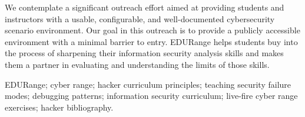 \documentclass[11pt]{report}
\begin{document}
We contemplate a significant outreach effort aimed at providing
students and instructors with a usable, configurable, and
well-documented cybersecurity scenario environment.  Our goal in this
outreach is to provide a publicly accessible environment with a
minimal barrier to entry.  EDURange helps students buy into the
process of sharpening their information security analysis skills and
makes them a partner in evaluating and understanding the limits of
those skills.

 EDURange; cyber range; hacker curriculum
principles; teaching security failure modes; debugging patterns;
information security curriculum; live-fire cyber range exercises;
hacker bibliography.
\end{document}
